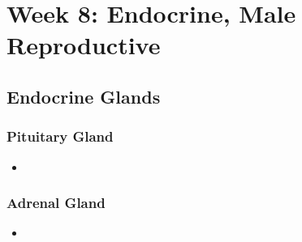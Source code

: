 \chapter{Week 8: Endocrine, Male Reproductive}

\section{Endocrine Glands}

\subsection{Pituitary Gland}
\begin{center}
\end{center}
\begin{itemize}
  \item 
\end{itemize}

\subsection{Adrenal Gland}
\begin{center}
\end{center}
\begin{itemize}
  \item 
\end{itemize}


